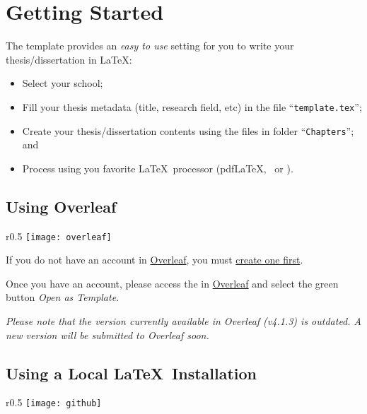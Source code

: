 \section{Getting Started}
\label{sec:getting_started}

The template provides an \emph{easy to use} setting for you to write your thesis/dissertation in \LaTeX:
\begin{itemize}
  \item  Select your school;
  \item Fill your thesis metadata (title, research field, etc) in the file “\texttt{template.tex}”;
  \item Create your thesis/dissertation contents using the files in folder “\texttt{Chapters}”; and
  \item Process using you favorite \LaTeX\ processor (pdf\LaTeX, \XeLaTeX\ or \LuaLaTeX).
\end{itemize}

\subsection{Using Overleaf}
\label{sub:using_overleaf}

\begin{wrapfigure}{r}{0.5\linewidth}
\vspace*{-15ex}\texttt{[image: overleaf]}%
\end{wrapfigure}

If you do not have an account in \href{https://www.overleaf.com?r=f5160636&rm=d&rs=b}{Overleaf}, you must \href{https://www.overleaf.com?r=f5160636&rm=d&rs=b}{create one first}.

Once you have an account, please access the  in \href{https://www.overleaf.com/latex/templates/new-university-of-lisbon-universidade-nova-de-lisboa-slash-unl-thesis-template/fwbztcrptjmg}{Overleaf} and select the green button \emph{Open as Template}. 

\emph{Please note that the version currently available in Overleaf (v4.1.3) is outdated. A new version will be submitted to Overleaf soon.}  

\subsection{Using a Local \LaTeX\ Installation}
\label{sub:using_local_latex}

\begin{wrapfigure}{r}{0.5\linewidth}
\vspace*{-15ex}\texttt{[image: github]}%
\end{wrapfigure}

